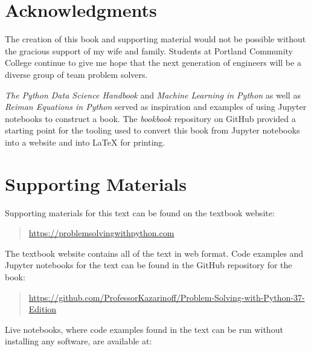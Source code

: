\documentclass{book}
\begin{document}
    
        \hypertarget{acknowledgments}{%
\section*{Acknowledgments}\label{acknowledgments} 
 }    




    
        The creation of this book and supporting material would not be possible
without the gracious support of my wife and family. Students at Portland
Community College continue to give me hope that the next generation of
engineers will be a diverse group of team problem solvers.

\emph{The Python Data Science Handbook} and \emph{Machine Learning in
Python} as well as \emph{Reiman Equations in Python} served as
inspiration and examples of using Jupyter notebooks to construct a book.
The \emph{bookbook} repository on GitHub provided a starting point for
the tooling used to convert this book from Jupyter notebooks into a
website and into LaTeX for printing.
    




    
        \hypertarget{supporting-materials}{%
\section*{Supporting Materials}\label{supporting-materials} 
 }    




    
        Supporting materials for this text can be found on the textbook website:

\begin{quote}
\url{https://problemsolvingwithpython.com}
\end{quote}

The textbook website contains all of the text in web format. Code
examples and Jupyter notebooks for the text can be found in the GitHub
repository for the book:

\begin{quote}
\url{https://github.com/ProfessorKazarinoff/Problem-Solving-with-Python-37-Edition}
\end{quote}

Live notebooks, where code examples found in the text can be run without
installing any software, are available at:
\end{document}
